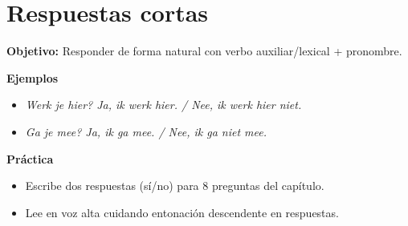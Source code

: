 \section{Respuestas cortas}
\textbf{Objetivo:} Responder de forma natural con verbo auxiliar/lexical + pronombre.

\textbf{Ejemplos}
\begin{itemize}[leftmargin=*]
  \item \textit{Werk je hier? Ja, ik werk hier. / Nee, ik werk hier niet.}
  \item \textit{Ga je mee? Ja, ik ga mee. / Nee, ik ga niet mee.}
\end{itemize}

\textbf{Práctica}
\begin{itemize}[leftmargin=*]
  \item Escribe dos respuestas (sí/no) para 8 preguntas del capítulo.
  \item Lee en voz alta cuidando entonación descendente en respuestas.
\end{itemize}

